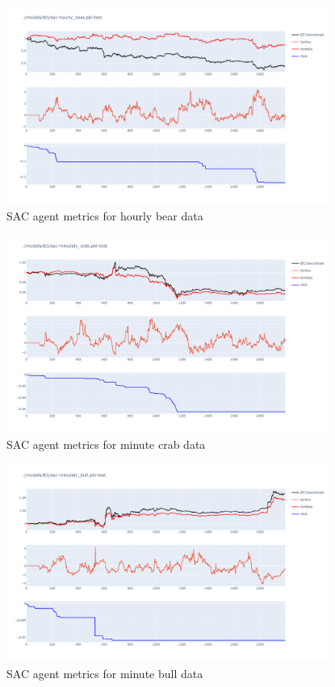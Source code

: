 \begin{figure}[H]
    \centering
    \includegraphics[width=0.94\textwidth]{graphics/testphoto/sac-hbr.png}
    \caption{SAC agent metrics for hourly bear data}
    \label{f-sac-hbr}
\end{figure}

\begin{figure}[H]
    \centering
    \includegraphics[width=0.94\textwidth]{graphics/testphoto/sac-mcr.png}
    \caption{SAC agent metrics for minute crab data}
    \label{f-sac-mcr}
\end{figure}

\begin{figure}[H]
    \centering
    \includegraphics[width=0.94\textwidth]{graphics/testphoto/sac-mbu.png}
    \caption{SAC agent metrics for minute bull data}
    \label{f-sac-mbu}
\end{figure}

